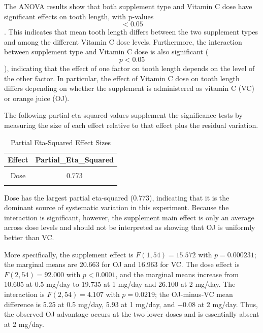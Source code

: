 \documentclass[
  11pt,
]{article}
\begin{document}
The ANOVA results show that both supplement type and Vitamin C dose have
significant effects on tooth length, with p-values \[< 0.05\]. This
indicates that mean tooth length differs between the two supplement
types and among the different Vitamin C dose levels. Furthermore, the
interaction between supplement type and Vitamin C dose is also
significant (\[p<0.05\]), indicating that the effect of one factor on
tooth length depends on the level of the other factor. In particular,
the effect of Vitamin C dose on tooth length differs depending on
whether the supplement is administered as vitamin C (VC) or orange juice
(OJ).

The following partial eta-squared values supplement the significance
tests by measuring the size of each effect relative to that effect plus
the residual variation.

\begin{table}[!h]
\centering
\caption{\label{tab:toothgrowth-effect-sizes}Partial Eta-Squared Effect Sizes}
\centering
\fontsize{10}{12}\selectfont
\begin{tabular}[t]{cc}
\toprule
\textbf{Effect} & \textbf{Partial\_Eta\_Squared}\\
\midrule
\cellcolor{gray!10}{Supplement} & \cellcolor{gray!10}{NA}\\
Dose & 0.773\\
\cellcolor{gray!10}{Supplement x Dose} & \cellcolor{gray!10}{0.132}\\
\bottomrule
\end{tabular}
\end{table}

Dose has the largest partial eta-squared (0.773), indicating that it is
the dominant source of systematic variation in this experiment. Because
the interaction is significant, however, the supplement main effect is
only an average across dose levels and should not be interpreted as
showing that OJ is uniformly better than VC.

More specifically, the supplement effect is \(F(1,54)=15.572\) with
\(p=0.000231\); the marginal means are 20.663 for OJ and 16.963 for VC.
The dose effect is \(F(2,54)=92.000\) with \(p<0.0001\), and the
marginal means increase from 10.605 at 0.5 mg/day to 19.735 at 1 mg/day
and 26.100 at 2 mg/day. The interaction is \(F(2,54)=4.107\) with
\(p=0.0219\); the OJ-minus-VC mean difference is 5.25 at 0.5 mg/day,
5.93 at 1 mg/day, and \(-0.08\) at 2 mg/day. Thus, the observed OJ
advantage occurs at the two lower doses and is essentially absent at 2
mg/day.
\end{document}
